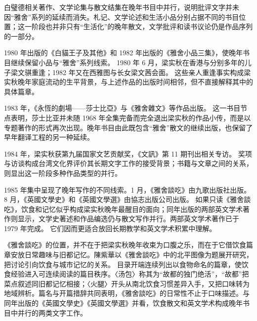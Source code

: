 \documentclass[UTF8,a4paper,zihao=-4,fontset=none]{ctexart}
\begin{document}
白璧德相关著作、文学论集与散文结集在晚年书目中并行，说明批评文字并未因“雅舍”系列的延续而消失。札记、文学论述和生活小品分别占据不同的书目位置；这一阶段也并非只有“生活化”的晚年散文，文学批评和读书议论仍是作品序列的一部分。

1980 年出版的《白貓王子及其他》和 1982 年出版的《雅舍小品三集》，使晚年书目继续保留小品与“雅舍”系列线索。\autocite{liang1980_baimao,liang1982_yashe_xiaopin_sanji,nmtl_liang_chronology} 1980 年 6 月，梁实秋在香港与分别多年的儿子梁文骐重逢；1982 年又在西雅图与长女梁文茜会面。\autocite{nmtl_liang_chronology,ntnu_liang_house_chronology} 这些亲人重逢事实构成梁实秋晚年家庭流动的生平背景，与上述作品的出版时间相邻，但不直接解释其中的具体篇章。

1983 年，《永恆的劇場——莎士比亞》与《雅舍雜文》等作品出版。\autocite{nmtl_liang_chronology} 这一书目节点表明，莎士比亚并未随 1968 年全集完备而完全退出梁实秋的作品小传，而是以专题著作的形式再次出现。晚年书目由此既包含“雅舍”散文的继续出版，也保留了早年翻译工程的另一种延续。

1984 年，梁实秋获第九届国家文艺贡献奖，《文訊》第 11 期刊出相关专访。\autocite{nmtl_liang_chronology} 奖项与访谈构成台湾文化界评价其长期文字工作的接受背景；书籍与文章之间的关系，则显出这一阶段多种作品类型的并行。

1985 年集中呈现了晚年写作的不同线索。1 月，《雅舍談吃》由九歌出版社出版。\autocite{nmtl_liang_chronology,liang1985_yashe_tanchi} 8 月，《英國文學史》和《英國文學選》由協志出版公司出版。\autocite{nmtl_liang_chronology,liang1985_yingguo_wenxueshi,liang1985_yingguo_wenxuan} 如果只读《雅舍談吃》，饮食和记忆似乎构成梁实秋晚年最醒目的面向；同年出版的两部英文学术著作则显示，文学史著述和作品编选仍与散文写作并行。两部英文学术著作已于 1979 年完成。\autocite{ntnu_liang_house_chronology} 它们因而更适合放回长期教学和英文学术积累中理解。

《雅舍談吃》的位置，并不在于把梁实秋晚年收束为口腹之乐，而在于它借饮食篇章安放日常趣味与旧都记忆。陳紫華以《雅舍談吃》中的北平图像为题展开研究，把讨论引向饮食与城市记忆的关系。\autocite{chenzihua2012_yashe_tanchi} 目录开端连续列出以食物命名的篇章\autocite{liang_yashe_tanchi_scan_unknown}，使饮食经验进入可连续阅读的篇目秩序。〈汤包〉称其为“故都的独门绝活”\autocite{liang_yashe_tanchi_scan_unknown}，“故都”把菜点叙述同旧都记忆相接；〈火腿〉开头从南北饮食习惯差异入手\autocite{liang_yashe_tanchi_scan_unknown}，又把口味转为地域辨析。篇名与开篇措辞共同表明，《雅舍談吃》的日常性不止于口味描述。与同年出版的《英國文學史》《英國文學選》并看，饮食散文和英文学术构成晚年书目中并行的两类文字工作。
\end{document}
